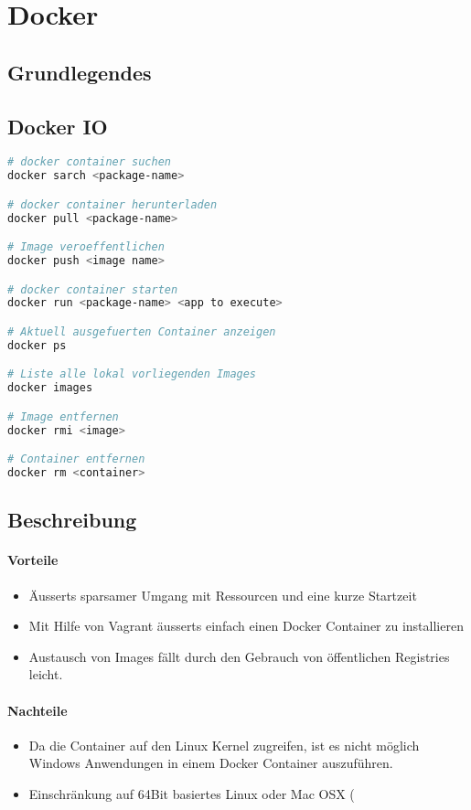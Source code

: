 \section{Docker}
\subsection{Grundlegendes}

\subsection{Docker IO}
\begin{lstlisting}[language=bash]
# docker container suchen
docker sarch <package-name>

# docker container herunterladen
docker pull <package-name>

# Image veroeffentlichen
docker push <image name>

# docker container starten
docker run <package-name> <app to execute>

# Aktuell ausgefuerten Container anzeigen
docker ps

# Liste alle lokal vorliegenden Images
docker images

# Image entfernen
docker rmi <image>

# Container entfernen
docker rm <container>
\end{lstlisting}


\subsection{Beschreibung}
\paragraph{Vorteile}
\begin{itemize}
	\item Äusserts sparsamer Umgang mit Ressourcen und eine kurze Startzeit	
	\item Mit Hilfe von Vagrant äusserts einfach einen Docker Container zu installieren
	\item Austausch von Images fällt durch den Gebrauch von öffentlichen Registries leicht.
\end{itemize}
\paragraph{Nachteile}
\begin{itemize}
	\item Da die Container auf den Linux Kernel zugreifen, ist es nicht möglich Windows Anwendungen in einem Docker Container auszuführen.
	\item Einschränkung auf 64Bit basiertes Linux oder Mac OSX (%
\end{itemize}

